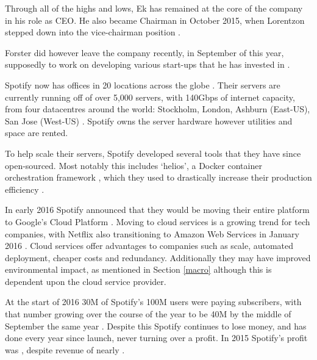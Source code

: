 
Through all of the highs and lows, Ek has remained at the core of the company in his role as CEO. He also became Chairman in October 2015, when Lorentzon stepped down into the vice-chairman position \parencite{lunden2016}.

Forster did however leave the company recently, in September of this year, supposedly to work on developing various start-ups that he has invested in \parencite{Glenday2016}. 


Spotify now has offices in 20 locations across the globe \parencite{Spotify2016}. Their servers are currently running off of over 5,000 servers, with 140Gbps of internet capacity, from four datacentres around the world: Stockholm, London, Ashburn (East-US), San Jose (West-US) \parencite{Garcia2013}. Spotify owns the server hardware however utilities and space are rented.

To help scale their servers, Spotify developed several tools that they have since open-sourced. Most notably this includes `helios', a Docker container orchestration framework \parencite{Github2016}, which they used to drastically increase their production efficiency \parencite{Vanlan2015}.

In early 2016 Spotify announced that they would be moving their entire platform to Google's Cloud Platform \parencite{Henderson2016}. Moving to cloud services is a growing trend for tech companies, with Netflix also transitioning to Amazon Web Services in January 2016 \parencite{Brodkin2016}. Cloud services offer advantages to companies such as scale, automated deployment, cheaper costs and redundancy. Additionally they may have improved environmental impact, as mentioned in Section \ref{macro} although this is dependent upon the cloud service provider.


At the start of 2016 30M of Spotify's 100M users were paying subscribers, with that number growing over the course of the year to be 40M by the middle of September the same year \parencite{30m_spotify, 40m_spotify}. Despite this Spotify continues to lose money, and has done every year since launch, never turning over a profit. In 2015 Spotify's profit was , despite revenue of nearly  \parencite{Titcomb2016}.

